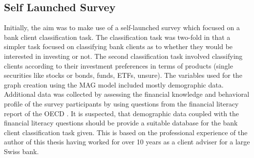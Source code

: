   \subsection{Self Launched Survey}
  \label{section:self_survey} 

  Initially, the aim was to make use of a self-launched survey which focused on
  a bank client classification task. The classification task was two-fold in 
  that a simpler task focused on classifying bank clients as to whether they 
  would be interested in investing or not. The second classification task
  involved classifying clients according to their investment preferences in
  terms of products (single securities like stocks or bonds, funds, ETFs,
  unsure). The variables used for the graph creation using the MAG model
  included mostly demographic data. Additional data was collected by assessing
  the financial knowledge and behavioral profile of the survey participants by 
  using questions from the financial literacy report of the OECD \citep{OECD2017}.
  It is suspected, that demographic data coupled with the financial literacy
  questions should be provide a suitable database for the bank client
  classification task given. This is based on the professional experience of
  the author of this thesis having worked for over 10 years as a client adviser
  for a large Swiss bank. \\

